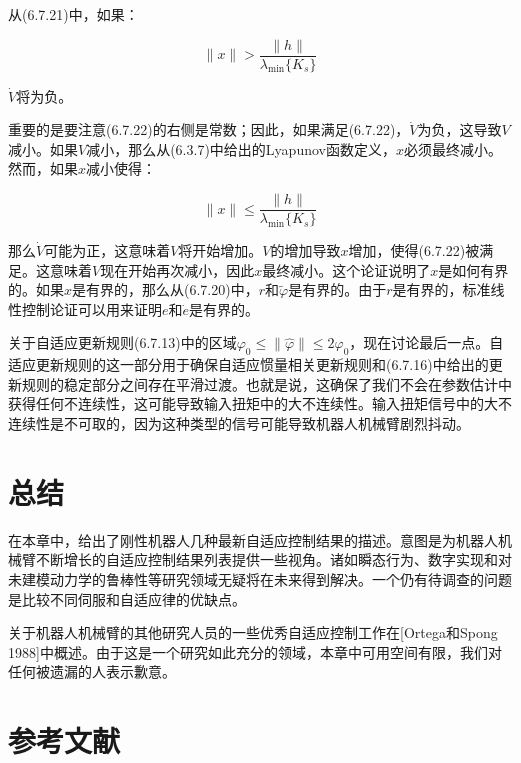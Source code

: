 \documentclass[12pt,a4paper]{ctexart}
\begin{document}
从(6.7.21)中，如果：

\begin{equation}\label{eq:condition-sigma}
\|x\| > \frac{\|h\|}{\lambda_{\min}\{K_s\}}
\end{equation}

$\dot{V}$将为负。

重要的是要注意(6.7.22)的右侧是常数；因此，如果满足(6.7.22)，$\dot{V}$为负，这导致$V$减小。如果$V$减小，那么从(6.3.7)中给出的Lyapunov函数定义，$x$必须最终减小。然而，如果$x$减小使得：

\begin{equation}\label{eq:small-x}
\|x\| \leq \frac{\|h\|}{\lambda_{\min}\{K_s\}}
\end{equation}

那么$\dot{V}$可能为正，这意味着$V$将开始增加。$V$的增加导致$x$增加，使得(6.7.22)被满足。这意味着$V$现在开始再次减小，因此$x$最终减小。这个论证说明了$x$是如何有界的。如果$x$是有界的，那么从(6.7.20)中，$r$和$\tilde{\varphi}$是有界的。由于$r$是有界的，标准线性控制论证可以用来证明$e$和$\dot{e}$是有界的。

关于自适应更新规则(6.7.13)中的区域$\varphi_0 \leq \|\hat{\varphi}\| \leq 2\varphi_0$，现在讨论最后一点。自适应更新规则的这一部分用于确保自适应惯量相关更新规则和(6.7.16)中给出的更新规则的稳定部分之间存在平滑过渡。也就是说，这确保了我们不会在参数估计中获得任何不连续性，这可能导致输入扭矩中的大不连续性。输入扭矩信号中的大不连续性是不可取的，因为这种类型的信号可能导致机器人机械臂剧烈抖动。

\section{总结}\label{sec:summary}

在本章中，给出了刚性机器人几种最新自适应控制结果的描述。意图是为机器人机械臂不断增长的自适应控制结果列表提供一些视角。诸如瞬态行为、数字实现和对未建模动力学的鲁棒性等研究领域无疑将在未来得到解决。一个仍有待调查的问题是比较不同伺服和自适应律的优缺点。

关于机器人机械臂的其他研究人员的一些优秀自适应控制工作在[Ortega和Spong 1988]中概述。由于这是一个研究如此充分的领域，本章中可用空间有限，我们对任何被遗漏的人表示歉意。

\section*{参考文献}
\end{document}
